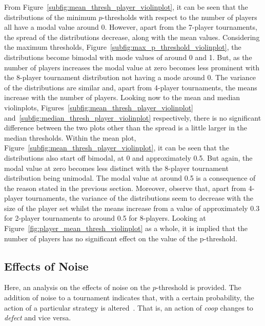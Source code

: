 From Figure~\ref{subfig:mean_thresh_player_violinplot}, it can be seen that the
distributions of the minimum \(p\)-thresholds with respect to the number of
players all have a modal value around 0. However, apart from the 7-player
tournaments, the spread of the distributions decrease, along with the mean
values. Considering the maximum thresholds,
Figure~\ref{subfig:max_p_threshold_violinplot}, the distributions become bimodal
with mode values of around 0 and 1. But, as the number of players increases the
modal value at zero becomes less prominent with the 8-player tournament
distribution not having a mode around 0. The variance of the distributions are
similar and, apart from 4-player tournaments, the means increase with the number
of players. Looking now to the mean and median violinplots,
Figures~\ref{subfig:mean_thresh_player_violinplot}
and~\ref{subfig:median_thresh_player_violinplot} respectively, there is no
significant difference between the two plots other than the spread is a little
larger in the median thresholds. Within the mean plot,
Figure~\ref{subfig:mean_thresh_player_violinplot}, it can be seen that the
distributions also start off bimodal, at 0 and approximately 0.5. But again, the
modal value at zero becomes less distinct with the 8-player tournament
distribution being unimodal. The modal value at around 0.5 is a consequence of
the reason stated in the previous section. Moreover, observe that, apart from
4-player tournaments, the variance of the distributions seem to decrease with
the size of the player set whilst the means increase from a value of
approximately 0.3 for 2-player tournaments to around 0.5 for 8-players. Looking
at Figure~\ref{fig:player_mean_thresh_violinplot} as a whole, it is implied
that the number of players has no significant effect on the value of the
p-threshold.


\subsection{Effects of Noise}\label{subsec:Effects_of_Noise}
Here, an analysis on the effects of noise on the \(p\)-threshold is provided.
The addition of noise to a tournament indicates that, with a certain
probability, the action of a particular strategy is
altered~\cite{glynatsi2020meta}. That is, an action of \textit{coop} changes to
\textit{defect} and vice versa.  


